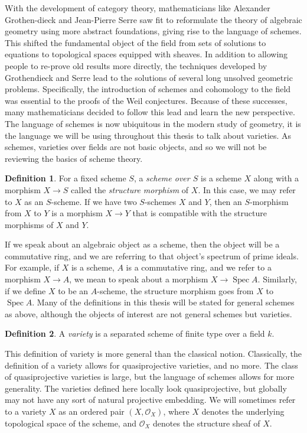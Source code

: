 \documentclass[12pt,twoside]{reedthesis}
\theoremstyle{plain}
\theoremstyle{definition}
\newtheorem{definition}{Definition}[section]
\theoremstyle{remark}
\newcommand{\calO}{\mathcal{O}}
\newcommand{\Spec}{\operatorname{Spec}}
\begin{document}
With the development of category theory, mathematicians like Alexander Grothen-dieck and Jean-Pierre Serre saw fit to reformulate the theory of algebraic geometry using more abstract foundations, giving rise to the language of schemes. This shifted the fundamental object of the field from sets of solutions to equations to topological spaces equipped with sheaves. In addition to allowing people to re-prove old results more directly, the techniques developed by Grothendieck and Serre lead to the solutions of several long unsolved geometric problems. Specifically, the introduction of schemes and cohomology to the field was essential to the proofs of the Weil conjectures. Because of these successes, many mathematicians decided to follow this lead and learn the new perspective. The language of schemes is now ubiquitous in the modern study of geometry, it is the language we will be using throughout this thesis to talk about varieties. As schemes, varieties over fields are not basic objects, and so we will not be reviewing the basics of scheme theory.
\begin{definition}
For a fixed scheme $S$, a \emph{scheme over $S$} is a scheme $X$ along with a morphism $X\to S$ called the \emph{structure morphism} of $X$. In this case, we may refer to $X$ as an $S$-scheme. If we have two $S$-schemes $X$ and $Y$, then an $S$-morphism from $X$ to $Y$ is a morphism $X\to Y$ that is compatible with the structure morphisms of $X$ and $Y$.\label{schemeOverDef}
\end{definition}
\noindent If we speak about an algebraic object as a scheme, then the object will be a commutative ring, and we are referring to that object's spectrum of prime ideals. For example, if $X$ is a scheme, $A$ is a commutative ring, and we refer to a morphism $X\to A$, we mean to speak about a morphism $X\to\Spec A$. Similarly, if we define $X$ to be an $A$-scheme, the structure morphism goes from $X$ to $\Spec A$. Many of the definitions in this thesis will be stated for general schemes as above, although the objects of interest are not general schemes but varieties.
\begin{definition}
A \emph{variety} is a separated scheme of finite type over a field $k$. \label{varDef}
\end{definition}
This definition of variety is more general than the classical notion. Classically, the definition of a variety allows for quasiprojective varieties, and no more. The class of quasiprojective varieties is large, but the language of schemes allows for more generality. The varieties defined here locally look quasiprojective, but globally may not have any sort of natural projective embedding. We will sometimes refer to a variety $X$ as an ordered pair $(X,\calO_X)$, where $X$ denotes the underlying topological space of the scheme, and $\calO_X$ denotes the structure sheaf of $X$. 
\end{document}
